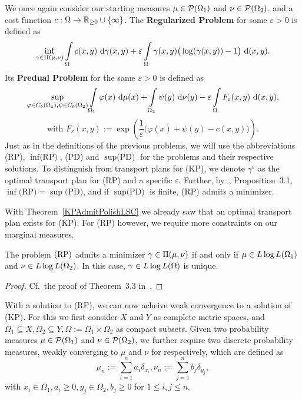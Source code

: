 \begin{definition}\label{RegProbs}
	We once again consider our starting measures $\mu \in \PM{\Omega_1}$ and $\nu \in \PM{\Omega_2}$, and a cost function $\map[c]{\Omega}{\RZero \cup \{ \infty \}}$. The \textbf{Regularized Problem} for some $\varepsilon > 0$ is defined as
	\[ \inf\limits_{\gamma \in \TP{\mu}{\nu}} \int\limits_\Omega c(x, y)~\Dx[x, y]{\gamma} + \varepsilon \int\limits_\Omega \gamma(x, y) \big( \log(\gamma(x, y)) - 1 \big)~\Dx[x, y]{}. \]
	Its \textbf{Predual Problem} for the same $\varepsilon > 0$ is defined as
	\[ \sup\limits_{\varphi \in \CF[b]{\Omega_1}, \psi \in \CF[b]{\Omega_2}} \int\limits_{\Omega_1} \varphi(x)~\Dx{\mu} + \int\limits_{\Omega_2} \psi(y)~\Dx[y]{\nu} - \varepsilon \int\limits_\Omega F_{\varepsilon}(x, y)~\Dx[x, y]{}, \]
	\[ \text{with } F_{\varepsilon}(x, y) := \exp\left( \frac{1}{\varepsilon} \big( \varphi(x) + \psi(y) - c(x, y) \big) \right). \]
	Just as in the definitions of the previous problems, we will use the abbreviations (RP), $\inf \text{(RP)}$, (PD) and $\sup \text{(PD)}$ for the problems and their respective solutions. To distinguish from transport plans for (KP), we denote $\gamma^{\varepsilon}$ as the optimal transport plan for (RP) and a specific $\varepsilon$. Further, by~\cite{Cla2021}, Proposition~3.1, $\inf \text{(RP)} = \sup \text{(PD)}$, and if $\sup \text{(PD)}$ is finite, (RP) admits a minimizer.
\end{definition}

With Theorem~\ref{KPAdmitPolishLSC} we already saw that an optimal transport plan exists for (KP). For (RP) however, we require more constraints on our marginal measures.

\begin{theorem}\label{RegProbAdmitLLL}
	The problem$\text{\normalfont\ (RP)}$ admits a minimizer $\gamma \in \TP{\mu}{\nu}$ if and only if $\mu \in \LLL[\Omega_1]$ and $\nu \in \LLL[\Omega_2]$. In this case, $\gamma \in \LLL$ is unique.
\end{theorem}

\begin{proof}
	Cf.~the proof of Theorem~3.3 in~\cite{Cla2021}.
\end{proof}

With a solution to (RP), we can now acheive weak convergence to a solution of (KP). For this we first consider $X$ and $Y$ as complete metric spaces, and $\Omega_1 \subseteq X, \Omega_2 \subseteq Y, \Omega := \Omega_1 \times \Omega_2$ as compact subsets. Given two probability measures $\mu \in \PM{\Omega_1}$ and $\nu \in \PM{\Omega_2}$, we further require two discrete probability measures, weakly converging to $\mu$ and $\nu$ for \Ninf{} respectively, which are defined as
\[ \mu_n := \sum_{i = 1}^n a_i \delta_{x_i}, \nu_n := \sum_{j = 1}^n b_j \delta_{y_j}, \]
with $x_i \in \Omega_1, a_i \ge 0, y_j \in \Omega_2, b_j \ge 0$ for $1 \le i, j \le n$.

